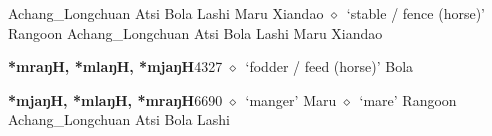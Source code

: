 \begin{list}{}{\leftmargin=1.5em \itemindent=-1.5em}
         Achang\_Longchuan 
\hspace{1ex}
         Atsi 
\hspace{1ex}
         Bola 
\hspace{1ex}
         Lashi 
\hspace{1ex}
         Maru 
\hspace{1ex}
         Xiandao 
\hspace{1ex}
         $\diamond$~`stable / fence (horse)'
         Rangoon 
\hspace{1ex}
         Achang\_Longchuan 
\hspace{1ex}
         Atsi 
\hspace{1ex}
         Bola 
\hspace{1ex}
         Lashi 
\hspace{1ex}
         Maru 
\hspace{1ex}
         Xiandao 
  \item {\footnotesize \textbf{*mraŋH, *mlaŋH, *mjaŋH}}{\tiny 4327}
\hspace{1ex}
         $\diamond$~`fodder / feed (horse)'
         Bola 
  \item {\footnotesize \textbf{*mjaŋH, *mlaŋH, *mraŋH}}{\tiny 6690}
\hspace{1ex}
         $\diamond$~`manger'
         Maru 
\hspace{1ex}
         $\diamond$~`mare'
         Rangoon 
\hspace{1ex}
         Achang\_Longchuan 
\hspace{1ex}
         Atsi 
\hspace{1ex}
         Bola 
\hspace{1ex}
         Lashi 

\end{list}
